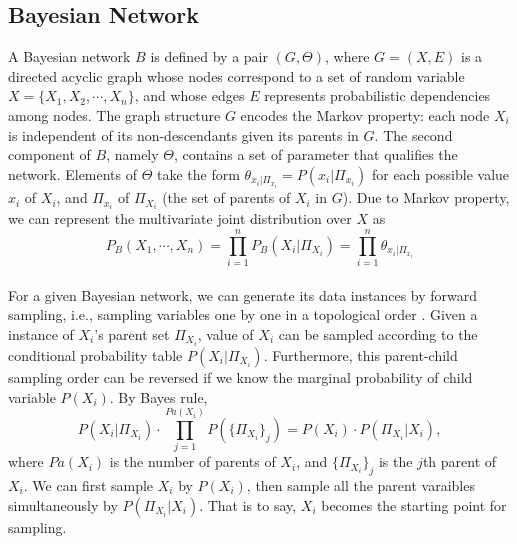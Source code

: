 \subsection{Bayesian Network}
\label{BN_basic}
A Bayesian network $B$ is defined by a pair $(G,\Theta)$, where $G = (X,E)$ is a directed acyclic graph whose nodes correspond to a set of random variable $X = \{  X_1, X_2, \cdots, X_n \}$, and whose edges $E$ represents probabilistic dependencies among nodes. The graph structure $G$ encodes the Markov property: each node $X_i$ is independent of its non-descendants given its parents in $G$. The second component of $B$, namely $\Theta$, contains a set of parameter that qualifies the network. Elements of $\Theta$ take the form $\theta_{x_i|\Pi_{x_i}} = P(x_i|\Pi_{x_i})$ for each possible value $x_i$ of $X_i$, and $\Pi_{x_i}$ of $\Pi_{X_i}$ (the set of parents of $X_i$ in $G$). Due to Markov property, we can represent the multivariate joint distribution over $X$ as
\begin{equation*}
P_B (X_1 , \cdots, X_n) = \prod_{i=1}^{n} P_B (X_i | \Pi_{X_i}) = \prod_{i=1}^{n} \theta_{x_i|\Pi_{x_i}}
\end{equation*}\\
For a given Bayesian network, we can generate its data instances by forward sampling, i.e., sampling variables one by one in a topological order \citep[see][chap.~22]{algo_2009}. Given a instance of $X_i$'s parent set $\Pi_{X_i}$, value of $X_i$ can be sampled according to the conditional probability table $P(X_i | \Pi_{X_i})$. Furthermore, this parent-child sampling order can be reversed if we know the marginal probability of child variable $P(X_i)$. By Bayes rule,
\begin{equation*}
P(X_i | \Pi_{X_i}) \cdot \prod_{j = 1}^{ Pa( X_i)} P( \{ \Pi_{X_i} \}_j) = P(X_i) \cdot P(\Pi_{X_i} | X_i),
\end{equation*}
where $Pa( X_i)$ is the number of parents of $X_i$, and $\{ \Pi_{X_i} \}_j$ is the $j$th parent of $X_i$. We can first sample $X_i$ by $P(X_i)$, then sample all the parent varaibles simultaneously by $P(\Pi_{X_i} | X_i)$. That is to say, $X_i$ becomes the starting point for sampling.

